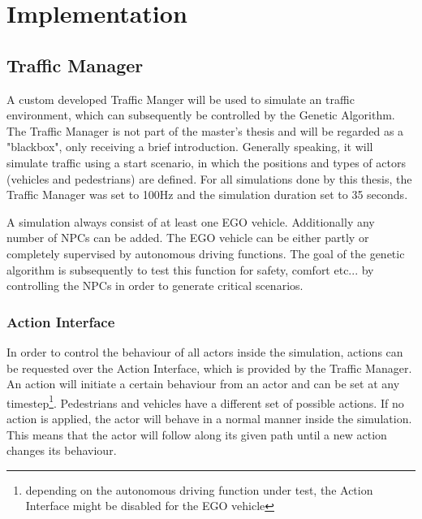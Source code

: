 \chapter{Implementation}
\label{chap:implementation}
\section{Traffic Manager}
A custom developed Traffic Manger will be used to simulate an traffic environment, which can subsequently be controlled by the Genetic Algorithm. The Traffic Manager is not part of the master's thesis and will be regarded as a "blackbox", only receiving a brief introduction. Generally speaking, it will simulate traffic using a start scenario, in which the positions and types of actors (vehicles and pedestrians) are defined. For all simulations done by this thesis, the Traffic Manager was set to 100Hz and the simulation duration set to 35 seconds.

A simulation always consist of at least one EGO vehicle. Additionally any number of NPCs can be added.
The EGO vehicle can be either partly or completely supervised by autonomous driving functions. The goal of the genetic algorithm is subsequently to test this function for safety, comfort etc... by controlling the NPCs in order to generate critical scenarios.

\subsection{Action Interface}
\label{sect:implementation:action_interface}
In order to control the behaviour of all actors inside the simulation, actions can be requested over the Action Interface, which is provided by the Traffic Manager. An action will initiate a certain behaviour from an actor and can be set at any timestep\footnote{depending on the autonomous driving function under test, the Action Interface might be disabled for the EGO vehicle}. Pedestrians and vehicles have a different set of possible actions. If no action is applied, the actor will behave in a normal manner inside the simulation. This means that the actor will follow along its given path until a new action changes its behaviour.

